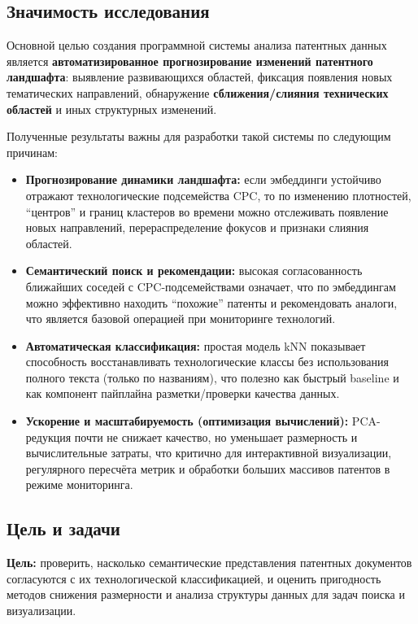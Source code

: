\documentclass{article}
\begin{document}
\subsection{Значимость исследования}
Основной целью создания программной системы анализа патентных данных является \textbf{автоматизированное прогнозирование изменений патентного ландшафта}: выявление развивающихся областей, фиксация появления новых тематических направлений, обнаружение \textbf{сближения/слияния технических областей} и иных структурных изменений.

Полученные результаты важны для разработки такой системы по следующим причинам:
\begin{itemize}
  \item \textbf{Прогнозирование динамики ландшафта:} если эмбеддинги устойчиво отражают технологические подсемейства CPC, то по изменению плотностей, ``центров'' и границ кластеров во времени можно отслеживать появление новых направлений, перераспределение фокусов и признаки слияния областей.
  \item \textbf{Семантический поиск и рекомендации:} высокая согласованность ближайших соседей с CPC-подсемействами означает, что по эмбеддингам можно эффективно находить ``похожие'' патенты и рекомендовать аналоги, что является базовой операцией при мониторинге технологий.
  \item \textbf{Автоматическая классификация:} простая модель kNN показывает способность восстанавливать технологические классы без использования полного текста (только по названиям), что полезно как быстрый baseline и как компонент пайплайна разметки/проверки качества данных.
  \item \textbf{Ускорение и масштабируемость (оптимизация вычислений):} PCA-редукция почти не снижает качество, но уменьшает размерность и вычислительные затраты, что критично для интерактивной визуализации, регулярного пересчёта метрик и обработки больших массивов патентов в режиме мониторинга.
\end{itemize}


\subsection{Цель и задачи}
\textbf{Цель:} проверить, насколько семантические представления патентных документов согласуются с их технологической классификацией, и оценить пригодность методов снижения размерности и анализа структуры данных для задач поиска и визуализации.
\end{document}
